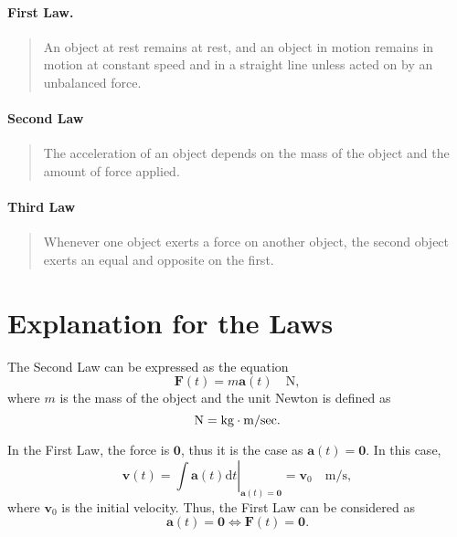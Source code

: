 \paragraph{First Law.}

\begin{quote}
	An object at rest remains at rest, and an object in motion remains in motion at constant speed and in a straight line unless acted on by an unbalanced force.
\end{quote}


\paragraph{Second Law}

\begin{quote}
	The acceleration of an object depends on the mass of the object and the amount of force applied.
\end{quote}


\paragraph{Third Law}

\begin{quote}
	Whenever one object exerts a force on another object, the second object exerts an equal and opposite on the first.
\end{quote}






\section{Explanation for the Laws}




The Second Law can be expressed as the equation
\begin{equation}
	\label{eq: Newton's Second Law}
	\mathbf F(t) = m \mathbf a(t) \quad \mathrm{N},
\end{equation}
where $m$ is the mass of the object and the unit Newton is defined as
$$
\rm N = kg \cdot m/sec.
$$

In the First Law, the force is $\mathbf 0$, thus it is the case as $\mathbf a(t) = \mathbf 0$. In this case,
$$
\mathbf v(t) = \left. \int \mathbf a(t) \mathrm d t \right|_{\mathbf a(t) = \mathbf 0} = \mathbf v_0 \quad \mathrm{m/s},
$$
where $\mathbf v_0$ is the initial velocity. Thus, the First Law can be considered as
\begin{equation}
	\label{eq: Newton's First Law}
	\mathbf a(t) = \mathbf 0 \iff \mathbf F(t) = \mathbf 0.
\end{equation}

